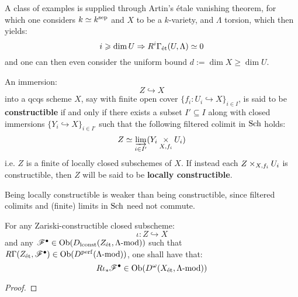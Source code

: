         \begin{example} \label{example: artin_etale_vanishing}
            A class of examples is supplied through Artin's \'etale vanishing theorem, for which one considers $k \simeq k^{\mathrm{sep}}$ and $X$ to be a $k$-variety, and $\Lambda$ torsion, which then yields:
                $$i \geqslant \dim U \Rightarrow R^i\Gamma_{\mathrm{\acute{e}t}}(U, \Lambda) \simeq 0$$
            and one can then even consider the uniform bound $d := \dim X \geq \dim U$.
        \end{example}

        \begin{definition} \label{def: constructible_subschemes}
            An immersion:
                $$Z \hookrightarrow X$$
            into a qcqs scheme $X$, say with finite open cover $\{f_i: U_i \hookrightarrow X\}_{i \in I}$, is said to be \textbf{constructible} if and only if there exists a subset $I' \subseteq I$ along with closed immersions $\{Y_i \hookrightarrow X\}_{i \in I'}$ such that the following filtered colimit in $\mathrm{Sch}$ holds:
                $$Z \cong \indlim_{i \in I'} (Y_i \x_{X, f_i} U_i)$$
            i.e. $Z$ is a finite  of locally closed subschemes of $X$. If instead each $Z \x_{X, f_i} U_i$ is constructible, then $Z$ will be said to be \textbf{locally constructible}.

            Being locally constructible is weaker than being constructible, since filtered colimits and (finite) limits in $\mathrm{Sch}$ need not commute.
        \end{definition}
        \begin{lemma} \label{lemma: constructible_etale_sheaves_with_perfect_global_Sections}
            For any Zariski-constructible closed subscheme:
                $$\iota: Z \hookrightarrow X$$
            and any $\mathscr{F}^{\bullet} \in \mathrm{Ob}( D_{\mathrm{lconst}}(Z_{\mathrm{\acute{e}t}}, \Lambda\text{-}\mathrm{mod}) )$ such that $R\Gamma(Z_{\mathrm{\acute{e}t}}, \mathscr{F}^{\bullet}) \in \mathrm{Ob}( D^{\mathrm{perf}}(\Lambda\text{-}\mathrm{mod}) )$, one shall have that:
                $$R\iota_*\mathscr{F}^{\bullet} \in \mathrm{Ob}( D^{\omega}(X_{\mathrm{\acute{e}t}}, \Lambda\text{-}\mathrm{mod}) )$$
        \end{lemma}
            \begin{proof}
                
            \end{proof}
